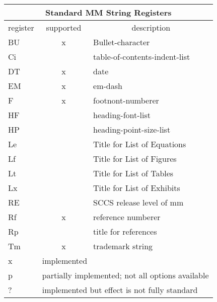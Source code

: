 \noindent
\begin{center}
\begin{tabular}{|l|c|l|}
\hline
\multicolumn{3}{|c|}{{\vrule height12pt width0pt depth3.5pt\Large
Standard MM String Registers}}\\ 
\hline\hline
register&	 supported&\multicolumn{1}{|c|}{description}\\
\hline
BU&		x&	Bullet-character\\
Ci&		&	table-of-contents-indent-list\\
DT&		x&	date\\
EM&		x&	em-dash\\
F&		x&	footnont-numberer\\
HF&		&	heading-font-list\\
HP&		&	heading-point-size-list\\
Le&		&	Title for List of Equations\\
Lf&		&	Title for List of Figures\\
Lt&		&	Title for List of Tables\\
Lx&		&	Title for List of Exhibits\\
RE&		&	SCCS release level of mm\\
Rf&		x&	reference numberer\\
Rp&		&	title for references\\
Tm&		x&	trademark string\\
\hline\hline
x&\multicolumn{2}{|l|}{implemented}\\
p&\multicolumn{2}{|l|}{partially implemented; not all options available}\\
?&\multicolumn{2}{|l|}{implemented but effect is not fully standard}\\
\hline
\end{tabular}
\end{center}
\medskip


